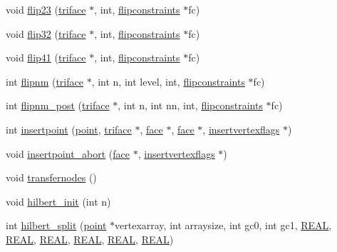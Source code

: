 \begin{DoxyCompactItemize}
\item 
void \hyperlink{classtetgenmesh_a134475b2c7d8269686cf3d7fbe11183d}{flip23} (\hyperlink{classtetgenmesh_1_1triface}{triface} $\ast$, int, \hyperlink{classtetgenmesh_1_1flipconstraints}{flipconstraints} $\ast$fc)
\item 
void \hyperlink{classtetgenmesh_a42d0630c17e609dc3224975693a992c4}{flip32} (\hyperlink{classtetgenmesh_1_1triface}{triface} $\ast$, int, \hyperlink{classtetgenmesh_1_1flipconstraints}{flipconstraints} $\ast$fc)
\item 
void \hyperlink{classtetgenmesh_a061a1d2f047d12726215eac51c7bb5a1}{flip41} (\hyperlink{classtetgenmesh_1_1triface}{triface} $\ast$, int, \hyperlink{classtetgenmesh_1_1flipconstraints}{flipconstraints} $\ast$fc)
\item 
int \hyperlink{classtetgenmesh_aab593bf52c98bf0315b39afc65c06312}{flipnm} (\hyperlink{classtetgenmesh_1_1triface}{triface} $\ast$, int n, int level, int, \hyperlink{classtetgenmesh_1_1flipconstraints}{flipconstraints} $\ast$fc)
\item 
int \hyperlink{classtetgenmesh_ac77db19e27c38b0ddace0482ffbd28a0}{flipnm\-\_\-post} (\hyperlink{classtetgenmesh_1_1triface}{triface} $\ast$, int n, int nn, int, \hyperlink{classtetgenmesh_1_1flipconstraints}{flipconstraints} $\ast$fc)
\item 
int \hyperlink{classtetgenmesh_a5d85611ca91db181e357457beb13a633}{insertpoint} (\hyperlink{classtetgenmesh_ace3fb4f80389185b7c9b18ab69a3dea2}{point}, \hyperlink{classtetgenmesh_1_1triface}{triface} $\ast$, \hyperlink{classtetgenmesh_1_1face}{face} $\ast$, \hyperlink{classtetgenmesh_1_1face}{face} $\ast$, \hyperlink{classtetgenmesh_1_1insertvertexflags}{insertvertexflags} $\ast$)
\item 
void \hyperlink{classtetgenmesh_ac7173aaaeb5600daa685af9c2c718834}{insertpoint\-\_\-abort} (\hyperlink{classtetgenmesh_1_1face}{face} $\ast$, \hyperlink{classtetgenmesh_1_1insertvertexflags}{insertvertexflags} $\ast$)
\item 
void \hyperlink{classtetgenmesh_aca4cdd18ce8662d83d00f3be302e594d}{transfernodes} ()
\item 
void \hyperlink{classtetgenmesh_a5b84bd9ae3b1797a1e11730b23c1a2c0}{hilbert\-\_\-init} (int n)
\item 
int \hyperlink{classtetgenmesh_a11227c742897ec6e617a82dc61fc460d}{hilbert\-\_\-split} (\hyperlink{classtetgenmesh_ace3fb4f80389185b7c9b18ab69a3dea2}{point} $\ast$vertexarray, int arraysize, int gc0, int gc1, \hyperlink{tetgen_8h_a4b654506f18b8bfd61ad2a29a7e38c25}{R\-E\-A\-L}, \hyperlink{tetgen_8h_a4b654506f18b8bfd61ad2a29a7e38c25}{R\-E\-A\-L}, \hyperlink{tetgen_8h_a4b654506f18b8bfd61ad2a29a7e38c25}{R\-E\-A\-L}, \hyperlink{tetgen_8h_a4b654506f18b8bfd61ad2a29a7e38c25}{R\-E\-A\-L}, \hyperlink{tetgen_8h_a4b654506f18b8bfd61ad2a29a7e38c25}{R\-E\-A\-L}, \hyperlink{tetgen_8h_a4b654506f18b8bfd61ad2a29a7e38c25}{R\-E\-A\-L})

\end{DoxyCompactItemize}
